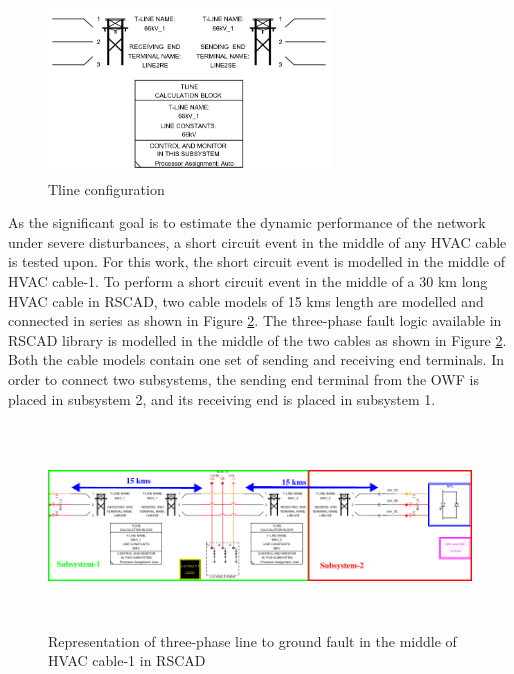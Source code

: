 \begin{figure}[H]
  \centering
  \includegraphics[height = 4.5cm,width = 7.5cm]{Diagrams/Chapter_4/TlineParaBlock.PNG}  
  \caption{Tline configuration}
  \label{fig:Tline_calculationbox_RSCAD}
\end{figure}

As the significant goal is to estimate the dynamic performance of the network under severe disturbances, a short circuit event in the middle of any \gls{HVAC} cable is tested upon. For this work, the short circuit event is modelled in the middle of HVAC cable-1. To perform a short circuit event in the middle of a 30 km long \gls{HVAC} cable in RSCAD, two cable models of 15 kms length are modelled and connected in series as shown in Figure \ref{fig:Subsystem_Trial}. The three-phase fault logic available in RSCAD library is modelled in the middle of the two cables as shown in Figure \ref{fig:Subsystem_Trial}. Both the cable models contain one set of sending and receiving end terminals. In order to connect two subsystems, the sending end terminal from the \gls{OWF} is placed in subsystem 2, and its receiving end is placed in subsystem 1. %

\begin{figure}[H]
\centering
    \includegraphics[height = 5.4cm,width = 17cm]{Diagrams/Chapter_4/subsystem_fault_mark.pdf}
    \caption{Representation of three-phase line to ground fault in the middle of HVAC cable-1 in RSCAD}
    \label{fig:Subsystem_Trial}
\end{figure}

